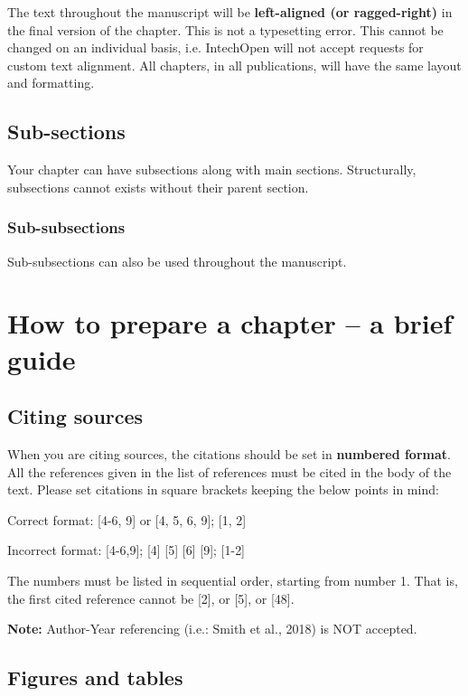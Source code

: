 \documentclass[numbers,sort&compress]{IntechOpen-Book}%
\begin{document}
The text throughout the manuscript will be \textbf{left-aligned (or ragged-right)} in the final version of the chapter. This is not a typesetting error. This cannot be changed on an individual basis, i.e. IntechOpen will not accept requests for custom text alignment. All chapters, in all publications, will have the same layout and formatting.

\subsection{Sub-sections}

Your chapter can have subsections along with main sections. Structurally, subsections cannot exists without their parent section.

\subsubsection{Sub-subsections}

Sub-subsections can also be used throughout the manuscript.

\section{How to prepare a chapter -- a brief guide}

\subsection{Citing sources}

When you are citing sources, the citations should be set in \textbf{numbered format}. All the references given in the list of references must be cited in the body of the text. Please set citations in square brackets keeping the below points in mind:

Correct format: [4-6, 9] or [4, 5, 6, 9]; [1, 2]

Incorrect format: [4-6,9]; [4] [5] [6] [9]; [1-2]

The numbers must be listed in sequential order, starting from number 1. That is, the first cited reference cannot be [2], or [5], or [48].

	\textbf{Note:} Author-Year referencing (i.e.: Smith et al., 2018) is NOT accepted.

\subsection{Figures and tables}
\end{document}

